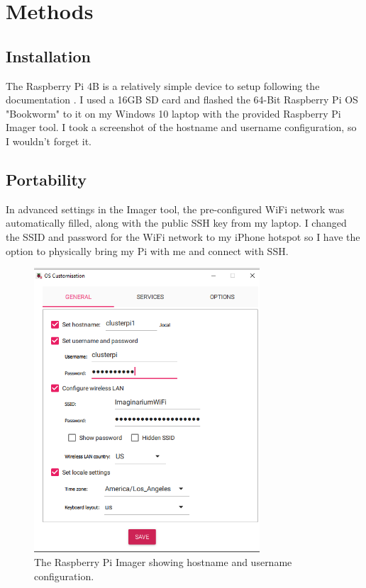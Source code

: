 \documentclass[12pt]{article}
\begin{document}
\section{Methods}\label{sec:methods}

\subsection{Installation}
The Raspberry Pi 4B is a relatively simple device to setup following the documentation \cite{raspberrypi_config}. I used a 16GB SD card and flashed the 64-Bit Raspberry Pi OS "Bookworm" to it on my Windows 10 laptop with the provided Raspberry Pi Imager tool. I took a screenshot of the hostname and username configuration, so I wouldn't forget it.

\subsection{Portability}
In advanced settings in the Imager tool, the pre-configured WiFi network was automatically filled, along with the public SSH key from my laptop. I changed the SSID and password for the WiFi network to my iPhone hotspot so I have the option to physically bring my Pi with me and connect with SSH. 

\begin{figure}[H]
\centering
\includegraphics[width=0.75\textwidth]{raspiconfig.png} %
\caption{The Raspberry Pi Imager showing hostname and username configuration.}
\label{fig:raspiconfig}
\end{figure}
\end{document}
